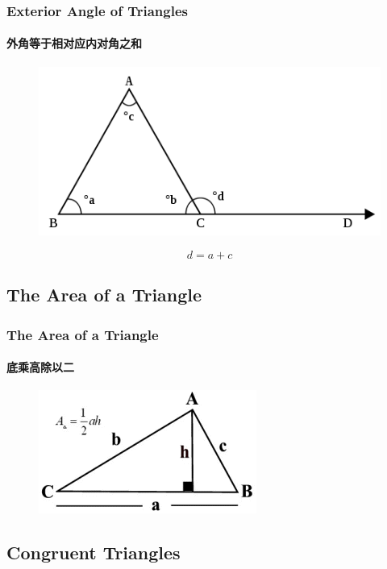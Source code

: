 \documentclass[
	11pt, %
]{beamer}
\begin{document}
\begin{frame}
	\frametitle{Exterior Angle of Triangles} %
	\framesubtitle{外角等于相对应内对角之和}
		\begin{figure}
		\includegraphics[width=0.5\linewidth]{Exterio_Angle.png}
	\end{figure}	
	\begin{theorem}
		\begin{equation*}
				d = a + c		
		\end{equation*}
	\end{theorem}
\end{frame}



\subsection{The Area of a Triangle}


\begin{frame}
	\frametitle{The Area of a Triangle} %
	\framesubtitle{底乘高除以二}
	\begin{figure}
		\includegraphics[width=0.5\linewidth]{Area_Triangle.png}
	\end{figure}	
\end{frame}


\subsection{Congruent Triangles}
\end{document}
